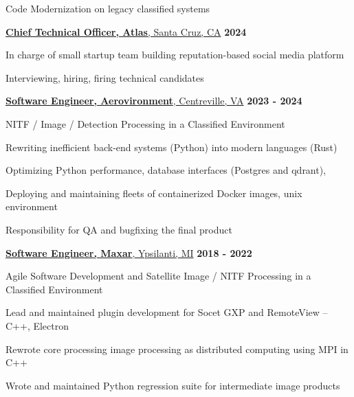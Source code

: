 \documentclass[margin,line]{resume}
\begin{document}
\begin{resume}
    \begin{list2}
    \item Code Modernization on legacy classified systems
    \end{list2}

    \underline{\textbf{Chief Technical Officer, Atlas}, Santa Cruz, CA}
    \hfill \textbf{\hfill 2024} \\
    \begin{list2}
    \item In charge of small startup team building reputation-based social media platform
    \item Interviewing, hiring, firing technical candidates
    \end{list2}

    \underline{\textbf{Software Engineer, Aerovironment}, Centreville, VA}
    \hfill \textbf{\hfill 2023 - 2024} \\

    \begin{list2}
    \item NITF / Image / Detection Processing in a Classified Environment
    \item Rewriting inefficient back-end systems (Python) into modern languages (Rust)
    \item Optimizing Python performance, database interfaces (Postgres and qdrant), 
    \item Deploying and maintaining fleets of containerized Docker images, unix environment
    \item Responsibility for QA and bugfixing the final product
    \end{list2}

    \underline{\textbf{Software Engineer, Maxar}, Ypsilanti, MI}
    \hfill \textbf{\hfill 2018 - 2022} \\

    \begin{list2}
    \item Agile Software Development and Satellite Image / NITF Processing in a Classified Environment
    \item Lead and maintained plugin development for Socet GXP and RemoteView -- C++, Electron
    \item Rewrote core processing image processing as distributed computing using MPI in C++
    \item Wrote and maintained Python regression suite for intermediate image products
    \end{list2}


\end{resume}
\end{document}
